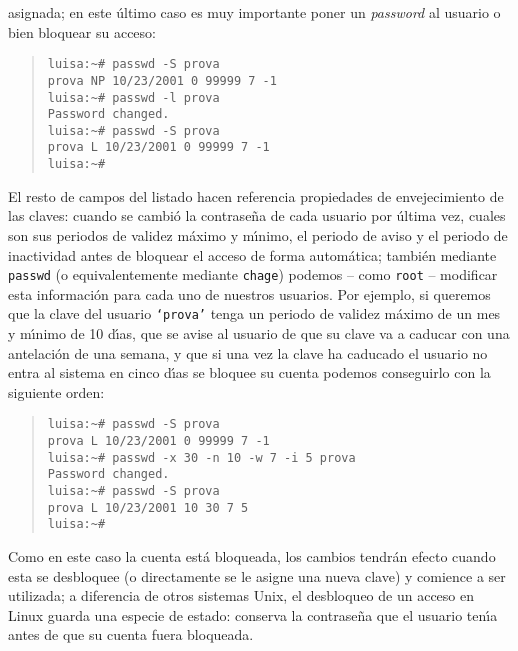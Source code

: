 asignada; en este \'ultimo caso es muy importante poner un {\it password} al 
usuario o bien bloquear su acceso:
\begin{quote}
\begin{verbatim}
luisa:~# passwd -S prova
prova NP 10/23/2001 0 99999 7 -1
luisa:~# passwd -l prova
Password changed.
luisa:~# passwd -S prova
prova L 10/23/2001 0 99999 7 -1
luisa:~# 
\end{verbatim}
\end{quote}
El resto de campos del listado hacen referencia propiedades de envejecimiento
de las claves: cuando se cambi\'o la contrase\~na de cada usuario por \'ultima
vez, cuales son sus periodos de validez m\'aximo y m\'{\i}nimo, el periodo de
aviso y el periodo de inactividad antes de bloquear el acceso de forma
autom\'atica; tambi\'en mediante {\tt passwd} (o equivalentemente mediante
{\tt chage}) podemos -- como {\tt root} -- modificar esta informaci\'on para 
cada uno de nuestros usuarios. Por ejemplo, si queremos que la clave del 
usuario {\tt `prova'} tenga un periodo de validez m\'aximo de un mes y 
m\'{\i}nimo de 10 d\'{\i}as, que se avise al usuario de que su clave va a 
caducar con una antelaci\'on de una semana, y que si una vez la clave ha 
caducado el usuario no entra al sistema en cinco d\'{\i}as se bloquee su cuenta
podemos conseguirlo con la siguiente orden:
\begin{quote}
\begin{verbatim}
luisa:~# passwd -S prova
prova L 10/23/2001 0 99999 7 -1
luisa:~# passwd -x 30 -n 10 -w 7 -i 5 prova
Password changed.
luisa:~# passwd -S prova
prova L 10/23/2001 10 30 7 5
luisa:~# 
\end{verbatim}
\end{quote}
Como en este caso la cuenta est\'a bloqueada, los cambios tendr\'an efecto 
cuando
esta se desbloquee (o directamente se le asigne una nueva clave) y comience a 
ser utilizada; a diferencia de otros sistemas Unix, el desbloqueo de un acceso 
en Linux guarda una especie de estado: conserva la contrase\~na que el usuario 
ten\'{\i}a antes de que su cuenta fuera bloqueada.

